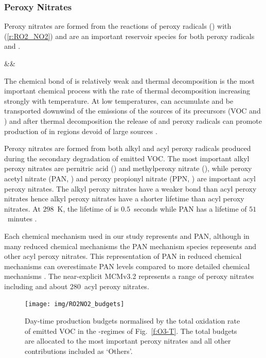 \subsubsection{Peroxy Nitrates} \label{sss:ro2no2}
Peroxy nitrates are formed from the reactions of peroxy radicals () with  (\ref{r:RO2_NO2}) and are an important reservoir species for both peroxy radicals and .
\begin{rxnarray}
    &&  \rightleftharpoons {} \label{r:RO2_NO2}
\end{rxnarray}
The chemical bond of  is relatively weak and thermal decomposition is the most important chemical process with the rate of thermal decomposition increasing strongly with temperature.
At low temperatures,  can accumulate and be transported downwind of the emissions of the sources of its precursors (VOC and ) and after thermal decomposition the release of  and peroxy radicals can promote production of  in regions devoid of large  sources \citep{Moxim:1996}.

Peroxy nitrates are formed from both alkyl and acyl peroxy radicals produced during the secondary degradation of emitted VOC.
The most important alkyl peroxy nitrates are pernitric acid () and methylperoxy nitrate (), while peroxy acetyl nitrate (PAN, ) and peroxy propionyl nitrate (PPN, ) are important acyl peroxy nitrates.
The alkyl peroxy nitrates have a weaker  bond than acyl peroxy nitrates hence alkyl peroxy nitrates have a shorter lifetime than acyl peroxy nitrates.
At $298$~K, the lifetime of  is $0.5$~seconds while PAN has a lifetime of $51$~minutes \citep{Orlando:2012}.

Each chemical mechanism used in our study represents  and PAN, although in many reduced chemical mechanisms the PAN mechanism species represents  and other acyl peroxy nitrates.
This representation of PAN in reduced chemical mechanisms can overestimate PAN levels compared to more detailed chemical mechanisms \citep{Luecken:1999}.
The near-explicit MCMv3.2 represents a range of peroxy nitrates including  and about $280$~acyl peroxy nitrates.

\begin{figure}[t]%
    \centering%
    \caption{Day-time  production budgets normalised by the total oxidation rate of emitted VOC in the -regimes of Fig.~\ref{f:O3-T}. The total budgets are allocated to the most important peroxy nitrates and all other contributions included as `Others'.}%
    \label{f:ro2no2_budgets}%
    \texttt{[image: img/RO2NO2\_budgets]}
\end{figure}

